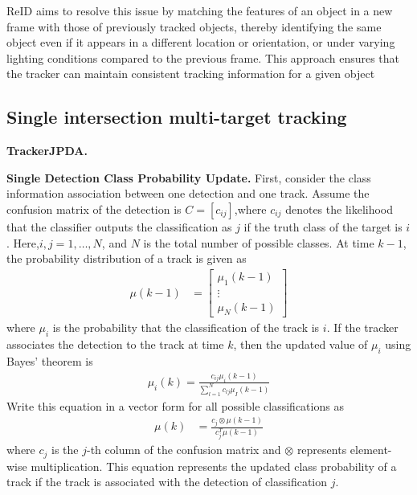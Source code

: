 ReID aims to resolve this issue by matching the features of an object in a new frame with those of previously tracked objects, thereby identifying the same object even if it appears in a different location or orientation, or under varying lighting conditions compared to the previous frame. 
This approach ensures that the tracker can maintain consistent tracking information for a given object\cite{Alpher24d}

\subsection{Single intersection multi-target tracking}

\textbf{TrackerJPDA.}

\textbf{Single Detection Class Probability Update.}
First, consider the class information association between one detection and one track. 
Assume the confusion matrix of the detection is $C=\left[c_{i j}\right]$,where $c_{i j}$ denotes the likelihood that the classifier outputs the classification as $j$ if the truth class of the target is $i$.
Here,$i,j = 1,…, N$, and $N$ is the total number of possible classes.
At time $k-1$, the probability distribution of a track is given as 
\begin{align}
	\mu(k-1) & = \left[\begin{array}{l}
		\mu_{1}(k-1) \\
		\vdots \\
		\mu_{N}(k-1)
	\end{array}\right]
\end{align}
where $\mu_{i}$ is the probability that the classification of the track is $i$.
If the tracker associates the detection to the track at time $k$, then the updated value of $\mu_{i}$ using Bayes' theorem is
\begin{align}
	\mu_{i}(k) = \frac{c_{i j} \mu_{i}(k-1)}{\sum_{l = 1}^{N} c_{l j} \mu_{I}(k-1)}
\end{align}
Write this equation in a vector form for all possible classifications as
\begin{align}
	\mu(k) & = \frac{c_{j} \otimes \mu(k-1)}{c_{j}^{T} \mu(k-1)}
\end{align}
where $c_{j}$ is the $j$-th column of the confusion matrix and $\otimes$ represents element-wise multiplication. 
This equation represents the updated class probability of a track if the track is associated with the detection of classification $j$.


